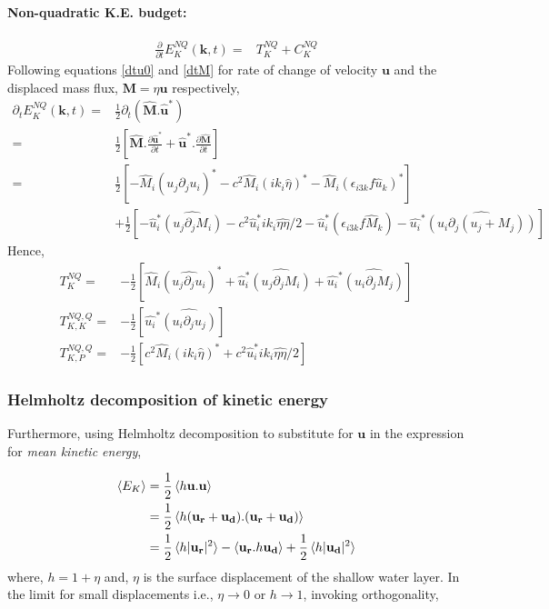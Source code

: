 \documentclass[a4paper,12pt]{paper}
\newcommand{\pder}[2][]{\frac{\partial#1}{\partial#2}}
\begin{document}
\paragraph{Non-quadratic K.E. budget:}
\begin{align*}
  \pder{t}E_K^{NQ}(\mathbf{k},t) =& T_K^{NQ} + C_K^{NQ}
\end{align*}
Following equations \eqref{dtu0} and \eqref{dtM} for rate of change of velocity 
$\mathbf{u}$ and the displaced mass flux, $\mathbf M = \eta \mathbf{u}$ 
respectively,
 \begin{align*}
 \partial_t E_K^{NQ}(\mathbf{k},t)
 =& \frac{1}{2}\partial_t(\mathbf{\hat M}.\mathbf{\hat u^*})\\
 =& \frac{1}{2}\left[ \mathbf{\hat M} .\pder[\mathbf{\hat u^*}]{t} 
		      + \mathbf{\hat u^*}. \pder[\mathbf{\hat M}]{t}\right]\\
 =& \frac{1}{2}\left[-\hat{M}_i(\widehat{ u_j\partial_j u_i })^*
		      - c^2 \hat{M}_i (ik_i \hat{\eta})^*
		      - \hat{M}_i (\epsilon_{i3k} f \hat{u}_k)^* \right]\\
  &+\frac{1}{2}\left[ - \hat{u}_i^* \widehat{(u_j\partial_j M_i) }
		      - c^2\hat{u}_i^*ik_i\widehat{\eta\eta}/2
		      - \hat{u}_i^* (\epsilon_{i3k} f \hat{M}_k) 
		      - \hat{u_i}^* \widehat{(u_i \partial_j({u}_j+ 
M_j))}
			\right]
\end{align*}
Hence,
\begin{align}
 T_K^{NQ}= & -\frac{1}{2}\left[\hat{M}_i(\widehat{ u_j\partial_j u_i })^*
			      + \hat{u}_i^* \widehat{(u_j\partial_j M_i) }
			      + \hat{u_i}^* \widehat{(u_i \partial_j{M}_j)}
			      \right] \\
 T_{K,K}^{NQ,Q}= & -\frac{1}{2}\left[ \hat{u_i}^* \widehat{(u_i 
\partial_j{u}_j)}
			\right] \\
 T_{K,P}^{NQ,Q}= & -\frac{1}{2}\left[c^2 \hat{M}_i (ik_i \hat{\eta})^*
	      + c^2\hat{u}_i^*ik_i\widehat{\eta\eta} /2
	      \right]
\end{align}

\subsubsection{Helmholtz decomposition of kinetic energy}

Furthermore, using Helmholtz decomposition to substitute for $\mathbf u$ in  
the expression 
for \emph{mean kinetic energy},

\begin{align}
\braket{ E_K} 
& = \frac{1}{2} \braket{ h\mathbf u.\mathbf u} \\
& = \frac{1}{2} \braket{h(\mathbf{u_r} + \mathbf{u_d} ).(\mathbf{u_r} + 
\mathbf{u_d} )}\\
& = \frac{1}{2}\braket{ h |\mathbf{u_r} | ^2} 
    -\braket{ \mathbf{u_r}.h\mathbf{u_d}}
    +  \frac{1}{2} \braket{ h | \mathbf{u_d}| ^2}
\end{align}
where, $h = 1 + \eta$ and, $\eta$ is the surface displacement of the shallow 
water layer. In the limit for small displacements i.e., $\eta \to 0$ or $ h \to 
1$, invoking orthogonality,
\end{document}
